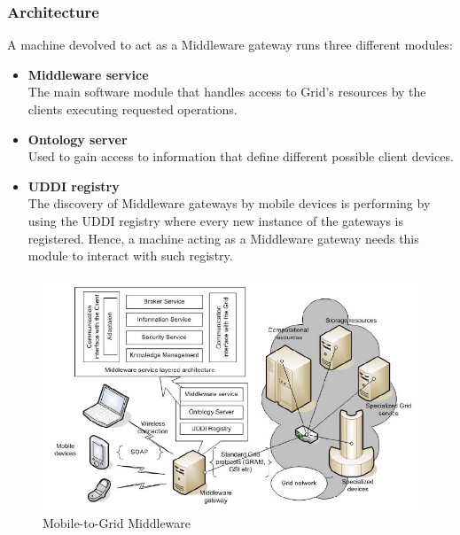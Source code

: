 \subsubsection{Architecture}
A machine devolved to act as a Middleware gateway runs three different modules:
\begin{itemize}
    \item \textbf{Middleware service}\\
    The main software module that handles access to Grid's resources by the clients executing requested operations.
    \item \textbf{Ontology server}\\
    Used to gain access to information that define different possible client devices.
    \item \textbf{UDDI registry}\\
    The discovery of Middleware gateways by mobile devices is performing by using the UDDI registry where every new instance of the gateways is registered. Hence, a machine acting as a Middleware gateway needs this module to interact with such registry.
\end{itemize}

\begin{figure}[H]
    \centering
    \includegraphics[scale=0.8]{document/chapters/chapter_3/images/2005_architecture.png}
    \caption{Mobile-to-Grid Middleware \cite{mobile_to_grid_middleware}}
    \label{fig:2005_architecture}
\end{figure}
\vspace{10mm}

